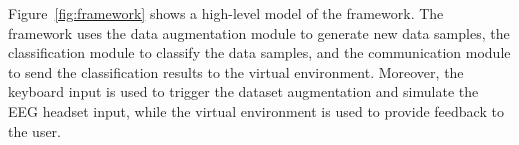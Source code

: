 Figure~\ref{fig:framework} shows a high-level model of the framework.
The framework uses the data augmentation module to generate new data samples, the classification module to classify the data samples, and the communication module to send the classification results to the virtual environment.
Moreover, the keyboard input is used to trigger the dataset augmentation and simulate the EEG headset input, while the virtual environment is used to provide feedback to the user.